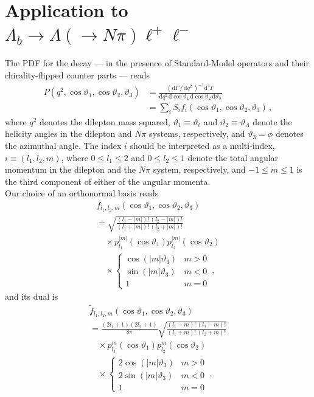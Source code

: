 \documentclass[aps,nofootinbib,preprintnumbers,prd,twocolumn]{revtex4-1}
\newcommand{\rmdx}[1]{\mbox{d} #1 \,} %
\renewcommand{\theta}{\vartheta}
\begin{document}
\section{Application to $\Lambda_b\to \Lambda(\to N \pi)\ell^+\ell^-$}
\label{app:lambdabtolambdall}

The PDF for the decay --- in the presence of Standard-Model operators and their chirality-flipped counter parts --- reads \cite{Boeer:2014xx}
\begin{equation}
\begin{aligned}
    P(q^2, \cos\theta_1, \cos\theta_2, \theta_3)
        & = \frac{(\rmdx{\Gamma} /\, \rmdx{q^2})^{-1} \rmdx{^4\Gamma}}{\rmdx{q^2} \rmdx{\cos\theta_1} \rmdx{\cos\theta_2} \rmdx{\theta_3}}\\
        & = \sum_i S_i f_i(\cos\theta_1, \cos\theta_2, \theta_3)\,,
\end{aligned}
\end{equation}
where $q^2$ denotes the dilepton mass squared, $\theta_1 \equiv \theta_\ell$ and $\theta_2 \equiv \theta_\Lambda$ denote the
helicity angles in the dilepton and
$N\pi$ systems, respectively, and $\theta_3 = \phi$ denotes the azimuthal angle.
The index $i$ should be interpreted as a multi-index, $i \equiv (l_1, l_2, m)$,
where $0 \leq l_1 \leq 2$ and $0 \leq l_2 \leq 1$ denote the total angular momentum in the
dilepton and the $N\pi$ system, respectively, and $-1 \leq m \leq 1$
is the third component of either of the angular momenta.\\

Our choice of an orthonormal basis reads
\begin{multline}
\label{eq:lambdab:bases1}
    f_{l_1, l_2, m}(\cos\theta_1, \cos\theta_2, \theta_3)\\
    = \sqrt{\frac{(l_1 - |m|)!\,(l_2 - |m|)!}{(l_1 + |m|)!\,(l_2 + |m|)!}}\\
    \quad \times p_{l_1}^{|m|}(\cos\theta_1) p_{l_2}^{|m|}(\cos\theta_2)\\
    \quad \times \begin{cases}
            \cos(|m|\theta_3) & m > 0\\
            \sin(|m|\theta_3) & m < 0\\
            1                 & m = 0
        \end{cases}\,,
\end{multline}
and its dual is
\begin{multline}
\label{eq:lambdab:bases2}
    \tilde{f}_{l_1, l_2, m}(\cos\theta_1, \cos\theta_2, \theta_3)\\
    = \frac{(2l_1 + 1)(2l_2 + 1)}{8\pi}\sqrt{\frac{(l_1 - m)!\,(l_2 - m)!}{(l_1 + m)!\,(l_2 + m)!}}\\
    \quad\times p_{l_1}^m(\cos\theta_1) p_{l_2}^m(\cos\theta_2)\\
    \quad \times \begin{cases}
            2 \cos(|m|\theta_3) & m > 0\\
            2 \sin(|m|\theta_3) & m < 0\\
            1                   & m = 0
        \end{cases}\,.\\
\end{multline}
\end{document}
